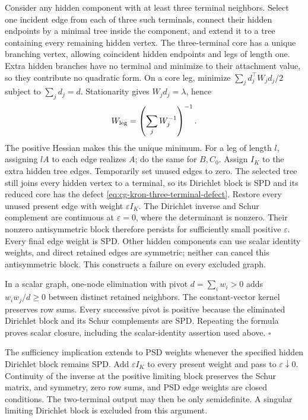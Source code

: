 Consider any hidden component with at least three terminal neighbors.
Select one incident edge from each of three such terminals, connect
their hidden endpoints by a minimal tree inside the component, and
extend it to a tree containing every remaining hidden vertex.
The three-terminal core has a unique branching vertex, allowing
coincident hidden endpoints and legs of length one. Extra hidden
branches have no terminal and minimize to their attachment value,
so they contribute no quadratic form. On a core leg, minimize
\(\sum_j d_j^\top W_jd_j/2\) subject to
\(\sum_jd_j=d\). Stationarity gives \(W_jd_j=\lambda\), hence
\begin{equation}
W_{\rm leg}=\left(\sum_jW_j^{-1}\right)^{-1}.
\label{eq:cg-kron-flat-series}
\end{equation}
The positive Hessian makes this the unique minimum. For a leg of
length \(l\), assigning \(lA\) to each edge realizes \(A\);
do the same for \(B,C_0\). Assign \(I_K\) to the extra hidden tree
edges. Temporarily set unused edges to zero. The selected tree
still joins every hidden vertex to a terminal, so its Dirichlet
block is SPD and its reduced core has the defect
\eqref{eq:cg-kron-three-terminal-defect}. Restore every unused
present edge with weight \(\varepsilon I_K\). The Dirichlet inverse
and Schur complement are continuous at \(\varepsilon=0\), where
the determinant is nonzero. Their nonzero antisymmetric block
therefore persists for sufficiently small positive \(\varepsilon\).
Every final edge weight is SPD. Other hidden components can use
scalar identity weights, and direct retained edges are symmetric;
neither can cancel this antisymmetric block. This constructs a
failure on every excluded graph.

In a scalar graph, one-node elimination with pivot
\(d=\sum_iw_i>0\) adds \(w_iw_j/d\geq0\) between distinct retained
neighbors. The constant-vector kernel preserves row sums.
Every successive pivot is positive because the eliminated
Dirichlet block and its Schur complements are SPD.
Repeating the formula proves scalar closure, including the
scalar-identity assertion used above. \(\square\)

The sufficiency implication extends to PSD weights whenever the specified
hidden Dirichlet block remains SPD. Add \(\varepsilon I_K\) to every
present weight and pass to \(\varepsilon\downarrow0\).
Continuity of the inverse at the positive limiting block preserves
the Schur matrix, and symmetry, zero row sums, and PSD edge weights
are closed conditions. The two-terminal output may then be only
semidefinite. A singular limiting Dirichlet block is excluded from
this argument. 

